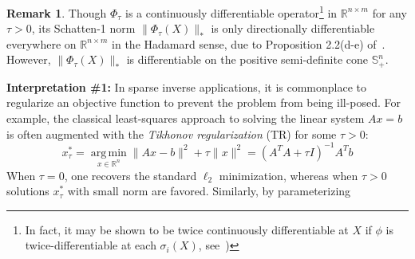 \documentclass[10pt]{article}
\numberwithin{equation}{section}
\newcommand{\+}{%
	\raisebox{0.18ex}{\scaleobj{0.55}{+}}
}
\DeclareMathOperator*{\argmin}{arg\,min}
\theoremstyle{definition}
\newtheorem{remark}{Remark}
\theoremstyle{definition}
\begin{document}
\begin{remark} 
	Though $\Phi_\tau$ is a continuously differentiable operator\footnote{In fact, it may be shown to be twice continuously differentiable at $X$ if $\phi$ is twice-differentiable at each $\sigma_i(X)$, see~\cite{ding2018spectral})} in $\mathbb{R}^{n \times m}$ for any $\tau > 0$, %
its Schatten-1 norm $\lVert\Phi_\tau(X)\rVert_\ast$ is only directionally differentiable everywhere on $\mathbb{R}^{n \times m}$ in the Hadamard sense, due to Proposition 2.2(d-e)  of~\cite{bi2013approximation}. However, $\lVert\Phi_\tau(X)\rVert_\ast$ is differentiable on the positive semi-definite cone $\mathbb{S}^n_+$.
\end{remark}
\noindent
\textbf{Interpretation \#1:} In sparse inverse applications, it is commonplace to regularize an objective function to prevent the problem from being ill-posed. 
For example, the classical least-squares approach to solving the linear system $A x = b$ is often augmented with the \emph{Tikhonov regularization} (TR) for some $\tau > 0$:
 \begin{equation}\label{eq:tikhonov}
	x_\tau^\ast = \argmin\limits_{x \in \mathbb{R}^n} \lVert Ax - b\rVert^2 + \tau \lVert x \rVert^2 = (A^T A + \tau I)^{-1} A^T b
\end{equation}
When $\tau = 0$, one recovers the standard $\ell_2$ minimization, whereas when $\tau > 0$ solutions $x_\tau^\ast$ with small norm are favored. 
Similarly, by parameterizing
\end{document}
